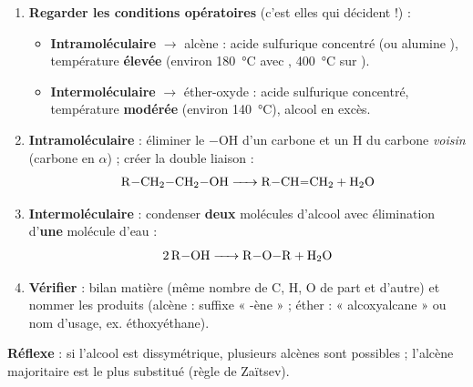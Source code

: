 \documentclass[11pt]{article}
\newcommand{\cle}[1]{{\popxbold\color{popdark}#1}}
\begin{document}
\begin{methode}
\begin{enumerate}
\item \textbf{Regarder les conditions opératoires} (c'est elles qui décident !) :
\begin{itemize}
\item \textbf{Intramoléculaire} $\to$ \cle{alcène} : acide sulfurique concentré (ou alumine ), température \textbf{élevée} (environ \SI{180}{\celsius} avec , \SI{400}{\celsius} sur ).
\item \textbf{Intermoléculaire} $\to$ \cle{éther-oxyde} : acide sulfurique concentré, température \textbf{modérée} (environ \SI{140}{\celsius}), alcool en excès.
\end{itemize}
\item \textbf{Intramoléculaire} : éliminer le $-$OH d'un carbone et un H du carbone \emph{voisin} (carbone en $\alpha$) ; créer la double liaison  :
\[ \ce{R-CH2-CH2-OH -> R-CH=CH2 + H2O} \]
\item \textbf{Intermoléculaire} : condenser \textbf{deux} molécules d'alcool avec élimination d'\textbf{une} molécule d'eau :
\[ \ce{2 R-OH -> R-O-R + H2O} \]
\item \textbf{Vérifier} : bilan matière (même nombre de C, H, O de part et d'autre) et nommer les produits (alcène : suffixe « -ène » ; éther : « alcoxyalcane » ou nom d'usage, ex. éthoxyéthane).
\end{enumerate}
\textbf{Réflexe} : si l'alcool est dissymétrique, plusieurs alcènes sont possibles ; l'alcène majoritaire est le plus substitué (règle de Zaïtsev).
\end{methode}
\end{document}
